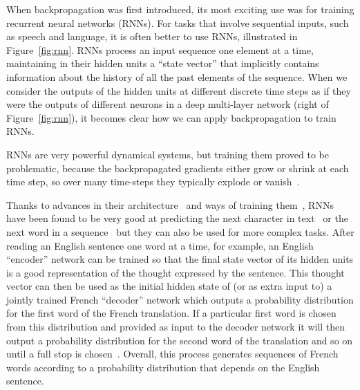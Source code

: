 \documentclass[10pts]{article}
\begin{document}
When backpropagation was first introduced, its most exciting use was
for training recurrent neural networks (RNNs). 
For tasks that involve sequential inputs, such as speech and language,
it is often better to use RNNs, illustrated in
Figure~\ref{fig:rnn}.  RNNs process an input
sequence one element at a time, maintaining in their hidden units a
``state vector'' that implicitly contains information about the
history of all the past elements of the sequence.  
When we consider the outputs of
the hidden units at different discrete time steps as if they were the
outputs of different neurons in a deep multi-layer network (right of
Figure~\ref{fig:rnn}), it becomes
clear how we can apply backpropagation to train RNNs.

RNNs are very powerful dynamical systems, but
training them proved to be problematic, because the
backpropagated gradients either grow or shrink at each time step, so
over many time-steps they typically explode or
vanish~\citep{Hochreiter91-small,Bengio-et-al-TNN1994}.

Thanks to advances in their architecture~\citep{Hochreiter+Schmidhuber-1997,ElHihi+Bengio-nips8-small} 
and ways of training them~\citep{Sutskever-thesis2012,Pascanu+al-ICML2013-small}, RNNs
have been found to be very good at predicting the next character in
text~\citep{Sutskever-et-al-ICML2011} or the next word in a
sequence~\citep{Mikolov-et-al-NIPS2013} but they can also be used for
more complex tasks.  After reading an English sentence one word at a
time, for example, an English ``encoder'' network can be trained so
that the final state vector of its hidden units is a good
representation of the thought expressed by the sentence.  This thought
vector can then be used as the initial hidden state of (or as extra
input to) a jointly trained French ``decoder'' network which outputs a
probability distribution for the first word of the French
translation. If a particular first word is chosen from this
distribution and provided as input to the decoder network it will then
output a probability distribution for the second word of the
translation and so on until a full stop is
chosen~\citep{Bahdanau-et-al-ICLR2015,Sutskever-et-al-NIPS2014}.
Overall, this process generates sequences of French words according to
a probability distribution that depends on the English sentence.
\end{document}
